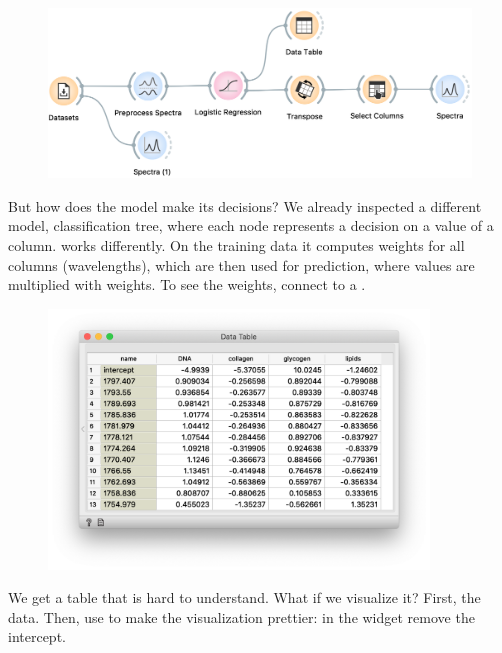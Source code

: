 \begin{figure}
  \centering
  \includegraphics[width=1.1\textwidth]{sp_classification-fig3.png}%
  \label{fig:spectra_classification-fig3}
\end{figure}
But how does the model make its decisions? We already inspected a different model, classification tree, where each node represents a decision on a value of a column.   works differently. On the training data it computes weights for all columns (wavelengths), which are then used for prediction, where values are multiplied with weights. To see the weights, connect  to a . 

\begin{figure}
  \vspace{-0.7cm}
  \includegraphics[width=0.9\textwidth]{sp_classification-fig4.png}
  \label{fig:spectra_classification-fig4}
\end{figure}
We get a table that is hard to understand. What if we visualize it? First,  the data. Then, use  to make the visualization prettier: in the widget remove the intercept.

